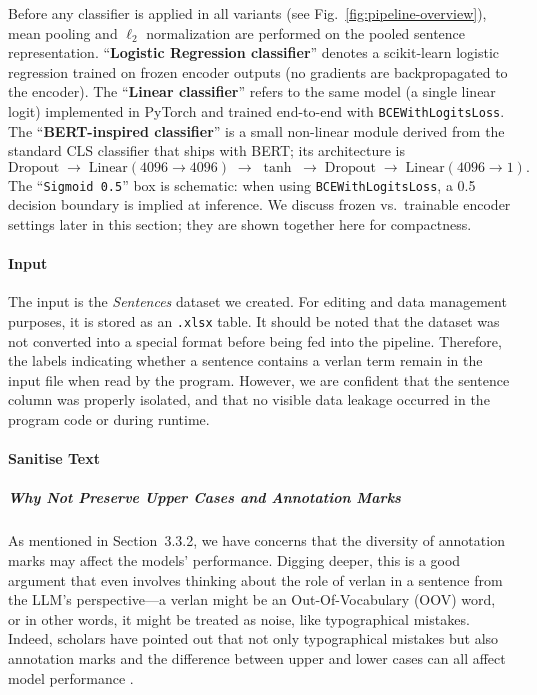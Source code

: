 \documentclass[12pt]{article}
\begin{document}
\noindent Before any classifier is applied in all variants (see Fig.~\ref{fig:pipeline-overview}), mean pooling and \(\ell_{2}\) normalization are performed on the pooled sentence representation. ``\textbf{Logistic Regression classifier}'' denotes a scikit-learn logistic regression trained on frozen encoder outputs (no gradients are backpropagated to the encoder). The ``\textbf{Linear classifier}'' refers to the same model (a single linear logit) implemented in PyTorch and trained end-to-end with \texttt{BCEWithLogitsLoss}. The ``\textbf{BERT-inspired classifier}'' is a small non-linear module derived from the standard CLS classifier that ships with BERT; its architecture is
\[
\text{Dropout} \;\to\; \text{Linear}(4096\!\to\!4096) \;\to\; \tanh \;\to\; \text{Dropout} \;\to\; \text{Linear}(4096\!\to\!1).
\]
The ``\texttt{Sigmoid 0.5}'' box is schematic: when using \texttt{BCEWithLogitsLoss}, a 0.5 decision boundary is implied at inference. We discuss frozen vs.\ trainable encoder settings later in this section; they are shown together here for compactness.


\paragraph{Input}
The input is the \textit{Sentences} dataset we created. For editing and data management purposes, it is stored as an \texttt{.xlsx} table. It should be noted that the dataset was not converted into a special format before being fed into the pipeline. Therefore, the labels indicating whether a sentence contains a verlan term remain in the input file when read by the program. However, we are confident that the sentence column was properly isolated, and that no visible data leakage occurred in the program code or during runtime.

\paragraph{Sanitise Text}
\subparagraph{Why Not Preserve Upper Cases and Annotation Marks}
As mentioned in Section~3.3.2, we have concerns that the diversity of annotation marks may affect the models' performance. Digging deeper, this is a good argument that even involves thinking about the role of verlan in a sentence from the LLM's perspective\;---\;a verlan might be an Out-Of-Vocabulary (OOV) word, or in other words, it might be treated as noise, like typographical mistakes. Indeed, scholars have pointed out that not only typographical mistakes but also annotation marks and the difference between upper and lower cases can all affect model performance \cite{alsharou2021noise}. 
\end{document}
